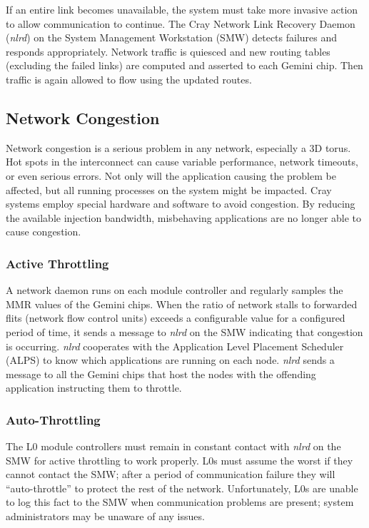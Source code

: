 \documentclass[10pt, conference, compsocconf]{IEEEtran}
\begin{document}
If an entire link becomes unavailable, the system must take more invasive
action to allow communication to continue.  The Cray Network Link Recovery
Daemon (\emph{nlrd}) on the System Management Workstation (SMW) detects failures and
responds appropriately.  Network traffic is quiesced and new routing tables
(excluding the failed links) are computed and asserted to each Gemini chip.
Then traffic is again allowed to flow using the updated routes.

\subsection{Network Congestion}

Network congestion is a serious problem in any network, especially a 3D torus.
Hot spots in the interconnect can cause variable performance, network timeouts,
or even serious errors.  Not only will the application causing the problem be
affected, but all running processes on the system might be impacted.  Cray
systems employ special hardware and software to avoid congestion.  By reducing
the available injection bandwidth, misbehaving applications are no longer able
to cause congestion.

\subsubsection{Active Throttling}

A network daemon runs on each module controller and regularly samples the MMR
values of the Gemini chips.  When the ratio of network stalls to forwarded
flits (network flow control units) exceeds a configurable value for a
configured period of time, it sends a message to \emph{nlrd} on the SMW indicating
that congestion is occurring.  \emph{nlrd} cooperates with the Application Level
Placement Scheduler (ALPS) to know which applications are running on each node.
\emph{nlrd} sends a message to all the Gemini chips that host the nodes with the
offending application instructing them to throttle.

\subsubsection{Auto-Throttling}

The L0 module controllers must remain in constant contact with \emph{nlrd} on
the SMW for active throttling to work properly.  L0s must assume the worst if
they cannot contact the SMW; after a period of communication failure they will
``auto-throttle'' to protect the rest of the network.  Unfortunately, L0s are
unable to log this fact to the SMW when communication problems are present;
system administrators may be unaware of any issues.
\end{document}
